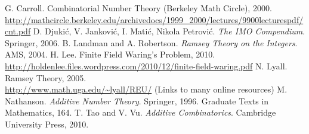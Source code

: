\begin{thebibliography}{9}
 G. Carroll. Combinatorial Number Theory (Berkeley Math Circle), 2000.\\
\url{http://mathcircle.berkeley.edu/archivedocs/1999_2000/lectures/9900lecturespdf/cnt.pdf}
 D. Djuki\'{c}, V. Jankovi\'c, I. Mati\'c, Nikola Petrovi\'c. {\it The IMO Compendium}. Springer, 2006.
 B. Landman and A. Robertson. {\it Ramsey Theory on the Integers}. AMS, 2004.
 H. Lee. Finite Field Waring's Problem, 2010.\\
\url{http://holdenlee.files.wordpress.com/2010/12/finite-field-waring.pdf}
 N. Lyall. Ramsey Theory, 2005.\\
\url{http://www.math.uga.edu/~lyall/REU/} (Links to many online resources)
 M. Nathanson. {\it Additive Number Theory}. Springer, 1996. Graduate Texts in Mathematics, 164.
 T. Tao and V. Vu. {\it Additive Combinatorics}. Cambridge University Press, 2010.
\end{thebibliography}
